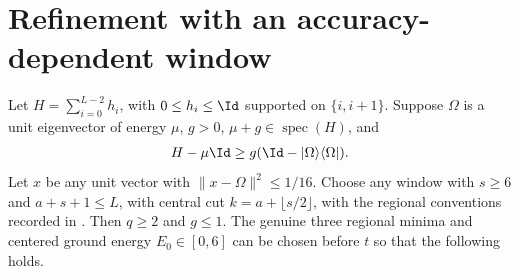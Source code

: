\section{Refinement with an accuracy-dependent window}

\begin{lemma}
    \label{thm:aklv_variable_window_refinement}
    \leanok
    Let $H=\sum_{i=0}^{L-2}h_i$, with $0\le h_i\le\Id$ supported on
    $\{i,i+1\}$. Suppose $\Omega$ is a unit eigenvector of energy $\mu$,
    $g>0$, $\mu+g\in\operatorname{spec}(H)$, and
    \begin{align*}
        H-\mu\Id\ge g(\Id-|\Omega\rangle\langle\Omega|).
    \end{align*}
    Let $x$ be any unit vector with $\|x-\Omega\|^2\le1/16$.
    Choose any window with $s\ge6$ and $a+s+1\le L$, with central cut
    $k=a+\lfloor s/2\rfloor$, with the regional conventions recorded in
    \cite{gap:aklv13_two_block_robustness}. Then $q\ge2$ and $g\le1$.
    The genuine three regional minima and centered ground energy
    $E_0\in[0,6]$ can be chosen before $t$ so that the following holds.


\end{lemma}
